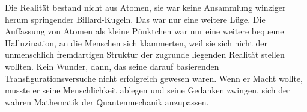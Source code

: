 Die Realität bestand nicht aus Atomen, sie war keine Ansammlung winziger herum springender Billard-Kugeln. Das war nur eine weitere Lüge. Die Auffassung von Atomen als kleine Pünktchen war nur eine weitere bequeme Halluzination, an die Menschen sich klammerten, weil sie sich nicht der unmenschlich fremdartigen Struktur der zugrunde liegenden Realität stellen wollten. Kein Wunder, dann, das seine darauf basierenden Transfigurationsversuche nicht erfolgreich gewesen waren. Wenn er Macht wollte, musste er seine Menschlichkeit ablegen und seine Gedanken zwingen, sich der wahren Mathematik der Quantenmechanik anzupassen.

